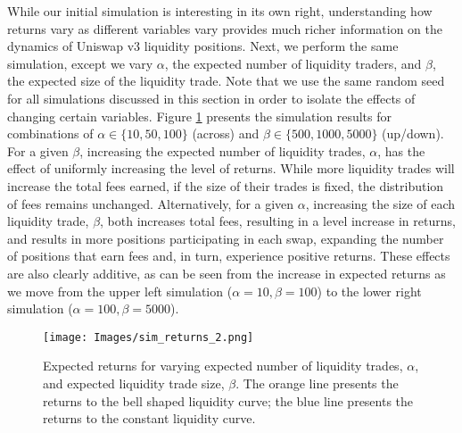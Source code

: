 \documentclass[11pt]{article}
\begin{document}
While our initial simulation is interesting in its own right, understanding how returns vary as different variables vary provides much richer information on the dynamics of Uniswap v3 liquidity positions. Next, we perform the same simulation, except we vary $\alpha$, the expected number of liquidity traders, and $\beta$, the expected size of the liquidity trade. Note that we use the same random seed for all simulations discussed in this section in order to isolate the effects of changing certain variables. Figure \ref{fig:sim_returns_2} presents the simulation results for combinations of $\alpha \in \{ 10, 50, 100\}$ (across) and $\beta \in \{ 500, 1000, 5000\}$ (up/down). For a given $\beta$, increasing the expected number of liquidity trades, $\alpha$, has the effect of uniformly increasing the level of returns. While more liquidity trades will increase the total fees earned, if the size of their trades is fixed, the distribution of fees remains unchanged. Alternatively, for a given $\alpha$, increasing the size of each liquidity trade, $\beta$, both increases total fees, resulting in a level increase in returns, and results in more positions participating in each swap, expanding the number of positions that earn fees and, in turn, experience positive returns. These effects are also clearly additive, as can be seen from the increase in expected returns as we move from the upper left simulation ($\alpha=10, \beta=100$) to the lower right simulation ($\alpha=100, \beta=5000$).

\begin{figure}[H]
    \centering
    \texttt{[image: Images/sim\_returns\_2.png]}
    \caption{Expected returns for varying expected number of liquidity trades, $\alpha$, and expected liquidity trade size, $\beta$. The orange line presents the returns to the bell shaped liquidity curve; the blue line presents the returns to the constant liquidity curve.}
    \label{fig:sim_returns_2}
\end{figure}
\end{document}
